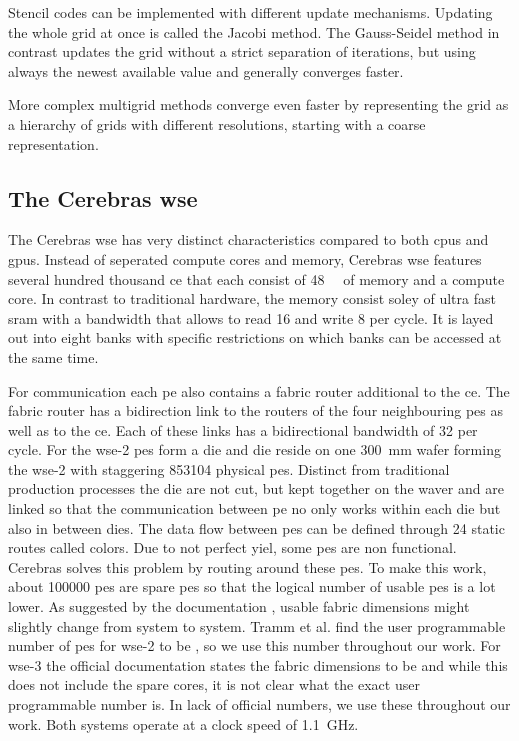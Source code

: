 Stencil codes can be implemented with different update mechanisms. Updating the whole grid at once is called the Jacobi method. The Gauss-Seidel method in contrast updates the grid without a strict separation of iterations, but using always the newest available value and generally converges faster.

More complex multigrid methods converge even faster by representing the grid as a hierarchy of grids with different resolutions, starting with a coarse representation. 

\subsection{The Cerebras \ac{wse}}
The Cerebras \ac{wse} has very distinct characteristics compared to both \acp{cpu} and \acp{gpu}.
Instead of seperated compute cores and memory, Cerebras \ac{wse} features several hundred thousand \ac{ce} that each consist of \qty{48}{\kilo\byte} of memory and a compute core. In contrast to traditional hardware, the memory consist soley of ultra fast \ac{sram} with a bandwidth that allows to read \qty{16}{\byte} and write \qty{8}{\byte} per cycle. It is layed out into eight banks with specific restrictions on which banks can be accessed at the same time.


For communication each \ac{pe} also contains a fabric router additional to the \ac{ce}. The fabric router has a bidirection link to the routers of the four neighbouring \acp{pe} as well as to the \ac{ce}. Each of these links has a bidirectional bandwidth of \qty{32}{\bit} per cycle. For the \ac{wse}-2  \acp{pe} form a die and  die reside on one \qty{300}{\mm} wafer forming the \ac{wse}-2 with staggering \num{853104} physical \acp{pe}. Distinct from traditional production processes the die are not cut, but kept together on the waver and are linked so that the communication between \ac{pe} no only works within each die but also in between dies.
The data flow between \acp{pe} can be defined through 24 static routes called colors.
Due to not perfect yiel, some \acp{pe} are non functional.
Cerebras solves this problem by routing around these \acp{pe}. 
To make this work, about \num{100000} \acp{pe} are spare \acp{pe} so that the logical number of usable \acp{pe} is a lot lower.
As suggested by the documentation \cite{cerebras_gemv_tutorial}, usable fabric dimensions might slightly change from system to system. Tramm et al. \cite{tramm2024efficient} find the user programmable number of \acp{pe} for \ac{wse}-2 to be , so we use this number throughout our work. For \ac{wse}-3 the official documentation states the fabric dimensions to be  and while this does not include the spare cores, it is not clear what the exact user programmable number is. In lack of official numbers, we use these throughout our work. Both systems operate at a clock speed of \qty{1.1}{\giga\hertz}.

